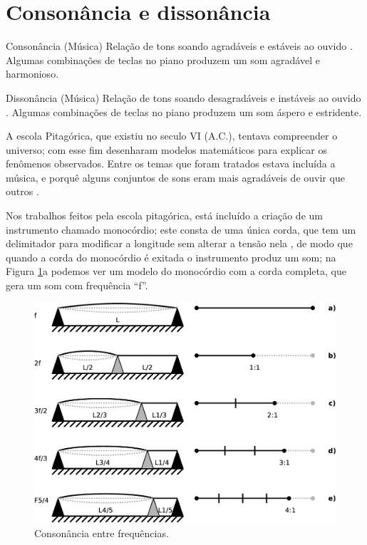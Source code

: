 \section{Consonância e dissonância}
\label{sec:consonancia}

\begin{tcbinformation}{Consonância (Música)}
\label{ref:consonancia}
Relação de tons soando agradáveis e estáveis ao ouvido \cite[pp. 26]{wright2012essential}.
Algumas combinações de teclas no piano produzem um som agradável e harmonioso.
\end{tcbinformation} 


\begin{tcbinformation}{Dissonância (Música)}
\label{ref:dissonancia}
Relação de tons soando desagradáveis e instáveis ao ouvido \cite[pp. 26]{wright2012essential}.
Algumas combinações de teclas no piano produzem um som áspero e estridente.
\end{tcbinformation} 



A escola Pitagórica, que existiu no seculo VI (A.C.),
tentava compreender o universo;
com esse fim desenharam modelos matemáticos para explicar 
os fenômenos observados.
Entre os temas que foram tratados estava incluída a música,
e porquê alguns conjuntos de sons eram mais 
agradáveis de ouvir que outros \cite[pp. 11]{arbones2012armonia}.

Nos trabalhos feitos pela escola pitagórica, 
está incluído a criação de um instrumento chamado monocórdio;
este consta de uma única corda,
que tem um delimitador para modificar a longitude sem alterar a tensão nela \cite[pp. 12]{arbones2012armonia},
de modo que quando a corda do monocórdio é exitada o instrumento produz um som;
na Figura \ref{fig:consonancia}a podemos ver um modelo do monocórdio com a corda completa, 
que gera um som com frequência ``f''.
\begin{figure}[!h]
  \centering
    \includegraphics[width=\textwidth]{chapters/cap-musica-composer/consonancia0.eps}
\caption{Consonância entre frequências.}
\label{fig:consonancia}
\end{figure}

